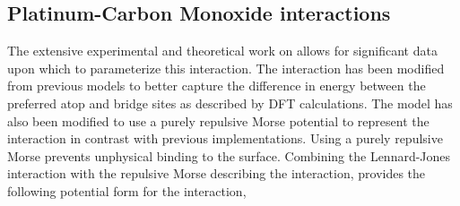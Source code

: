 
\subsection{Platinum-Carbon Monoxide interactions} The extensive experimental
\citep{Ertl:1977cg, Kelemen:1979ad, Yeo:1997th, Szanyi:1992aa, Schweizer:1989fk, Ertl:1989}
and theoretical \citep{Feibelman:2001qa, Deshlahra:2009wu,
Deshlahra:2012aa, Beurden:2002ys, Korzeniewski:1986kl, Mason:2004ix} work on
 allows for significant data upon which to parameterize this
interaction.  The  interaction has been
modified from previous models\citep{Michalka:2013aa, Michalka:2015aa} to better
capture the difference in energy between the preferred atop and bridge sites as
described by DFT calculations.\citep{Deshlahra:2012aa} The model has also been
modified to use a purely repulsive Morse potential to represent the
 interaction in contrast with previous
implementations.\citep{Korzeniewski:1986kl, Michalka:2013aa} Using a purely
repulsive Morse prevents unphysical  binding to the surface.
Combining the Lennard-Jones  interaction with the repulsive
Morse describing the  interaction, provides the following
potential form for the  interaction,

